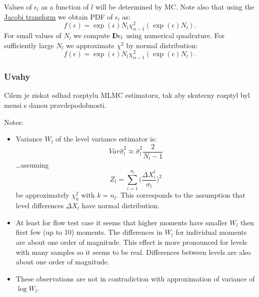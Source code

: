 \documentclass{article}
\def \D{{{\rm I\kern-.3em D}}}
\begin{document}
Values of $\epsilon_l$ as a function of $l$ will be determined by MC. Note also that using the \href{https://en.wikipedia.org/wiki/Probability_density_function#Dependent_variables_and_change_of_variables}{Jacobi transform} we obtain PDF of $\epsilon_l$ as:
$$
    f(\epsilon) = \exp(\epsilon)N_l\chi^2_{n-1}(\exp(\epsilon)N_l).
$$
For small values of $N_l$ we compute $\D \epsilon_l$ using numerical quadrature. For sufficiently large $N_l$ we approximate $\chi^2$ by normal distribution:
$$
    f(\epsilon) = \exp(\epsilon)N_l\chi^2_{n-1}(\exp(\epsilon)N_l).
$$
\subsubsection{Uvahy}
Cilem je ziskat odhad rozptylu MLMC estimatoru, tak aby skutecny rozptyl byl mensi s danou pravdepodobnosti. 

Notes:
\begin{itemize}
    \item Variance $W_l$ of the level variance estimator is:
    \[
        Var \hat\sigma_l^2 \approx \hat\sigma_l^2 \frac{2}{N_l - 1}
    \]
    \dots assuming
    \[
    Z_l = \sum_{i=1}^{n_l}\Big(\frac{\Delta X^l_i}{\sigma_l}\Big)^2
    \]
    be approximately $\chi^2_k$ with $k=n_l$. This corresponds to the assumption that level differences $\Delta X_l$ have normal distribution. 
    \item At least for flow test case it seems that higher moments have smaller $W_l$ then first few (up to 10) moments. The differences in $W_l$ for individual moments are about one order of magnitude.  This effect is more pronounced for levels with many samples so it seems to be real. Differences between levels are also about one order of magnitude.
    \item These observations are not in contradiction with approximation of variance of  $\log W_l$.
\end{itemize}
\end{document}

